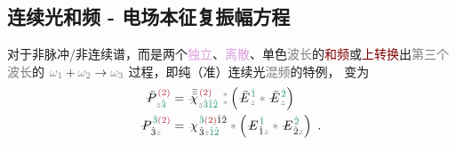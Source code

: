 \subsection{连续光和频 - 电场本征复振幅方程}\label{ssec:SFG_discrete}

对于\textcolor{NavyBlue}{非脉冲}/\textcolor{NavyBlue}{非连续谱}，而是两个\textcolor{Plum}{独立}、\textcolor{Plum}{离散}、\textcolor{NavyBlue}{单色}\textcolor{gray}{波长}的\textcolor{Maroon}{和频}或\textcolor{Maroon}{上转换}出\textcolor{gray}{第三个波长}的 $\mathcolor{gray}{\omega}_{\textcolor{gray}{1}} + \mathcolor{gray}{\omega}_{\textcolor{gray}{2}} \to \mathcolor{gray}{\omega}_{\textcolor{gray}{3}}$ 过程，即纯\textcolor{NavyBlue}{（准）连续光}\textcolor{gray}{混频}的特例， 变为
\begin{subequations} \label{eq:DP^(2)-3_12-discrete}
	\begin{align}
		\xint{\mathcolor{gray}{-}}{30}{\bar{P}}^{\;\! \textcolor{Maroon}{(2)} }_{\;\! \mathcolor{gray}{z} \textcolor{PineGreen}{\hat{3}}} &= \xint{{}^{}_{\mathcolor{gray}{-}}}{23}{\bar{\bar{\bar{\chi}}}}^{\;\!  \textcolor{Maroon}{(2)}}_{\mathcolor{gray}{z} \textcolor{PineGreen}{\hat{3} \hat{1} \hat{2}} } ~{}^{\mathcolor{gray}{*}}_{\mathcolor{gray}{*}} \left( \xint{\mathcolor{gray}{-}}{295}{\bar{E}}^{\;\! \textcolor{PineGreen}{\hat{1}} }_{\;\! \mathcolor{gray}{z} } \mathcolor{gray}{*} \xint{\mathcolor{gray}{-}}{295}{\bar{E}}^{\;\! \textcolor{PineGreen}{\hat{2}} }_{\;\! \mathcolor{gray}{z} } \right) \label{eq:vec-DP^(2)-3_12-discrete} \\
		\xint{\mathcolor{gray}{-}}{30}{P}^{\;\! \textcolor{PineGreen}{\hat{3}} \textcolor{Maroon}{(2)} }_{\;\! \hat{3}\mathcolor{gray}{z}} &= \xint{{}^{}_{\mathcolor{gray}{-}}}{23}{\chi}^{\;\! \textcolor{PineGreen}{\hat{3}} \textcolor{Maroon}{(2)} \hat{1} \hat{2} }_{\;\! \hat{3} \mathcolor{gray}{z} \textcolor{PineGreen}{\hat{1} \hat{2}}} \mathcolor{gray}{*} \left( \xint{\mathcolor{gray}{-}}{295}{E}^{\;\!\textcolor{PineGreen}{\hat{1}}}_{\;\! \hat{1} \mathcolor{gray}{z}} \mathcolor{gray}{*} \xint{\mathcolor{gray}{-}}{295}{E}^{\;\!\textcolor{PineGreen}{\hat{2}}}_{\;\! \hat{2} \mathcolor{gray}{z}} \right) ~. \label{eq:components-DP^(2)-3_12-discrete}
	\end{align}
\end{subequations}
